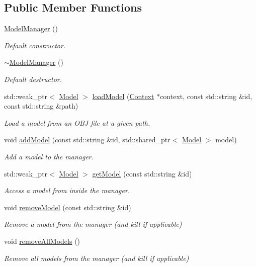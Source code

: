 \subsection*{Public Member Functions}
\begin{DoxyCompactItemize}
\item 
\hyperlink{class_model_manager_a9b0d22b1baf59c5b566e82fcd8ca424a}{Model\+Manager} ()
\begin{DoxyCompactList}\small\item\em Default constructor. \end{DoxyCompactList}\item 
\hyperlink{class_model_manager_a93f4eea50036cc5453014234aa921c7c}{$\sim$\+Model\+Manager} ()
\begin{DoxyCompactList}\small\item\em Default destructor. \end{DoxyCompactList}\item 
std\+::weak\+\_\+ptr$<$ \hyperlink{class_model}{Model} $>$ \hyperlink{class_model_manager_a2c4b109b70055b540c47ca202d2accf8}{load\+Model} (\hyperlink{class_context}{Context} $\ast$context, const std\+::string \&id, const std\+::string \&path)
\begin{DoxyCompactList}\small\item\em Load a model from an O\+BJ file at a given path. \end{DoxyCompactList}\item 
void \hyperlink{class_model_manager_a38d48d14d9e917b233bb115ebac2809b}{add\+Model} (const std\+::string \&id, std\+::shared\+\_\+ptr$<$ \hyperlink{class_model}{Model} $>$ model)
\begin{DoxyCompactList}\small\item\em Add a model to the manager. \end{DoxyCompactList}\item 
std\+::weak\+\_\+ptr$<$ \hyperlink{class_model}{Model} $>$ \hyperlink{class_model_manager_ae85e1de097acb0c11ba546af7f86d60a}{get\+Model} (const std\+::string \&id)
\begin{DoxyCompactList}\small\item\em Access a model from inside the manager. \end{DoxyCompactList}\item 
void \hyperlink{class_model_manager_af18912c600422fbdaddf25e169006dac}{remove\+Model} (const std\+::string \&id)
\begin{DoxyCompactList}\small\item\em Remove a model from the manager (and kill if applicable) \end{DoxyCompactList}\item 
void \hyperlink{class_model_manager_a7e0bb3438ed9c054ab76297ae71ac78e}{remove\+All\+Models} ()
\begin{DoxyCompactList}\small\item\em Remove all models from the manager (and kill if applicable) \end{DoxyCompactList}\end{DoxyCompactItemize}
